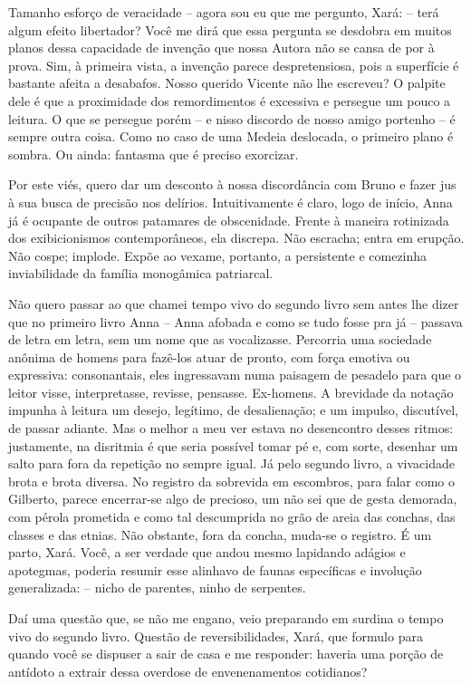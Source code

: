 Tamanho esforço de veracidade -- agora sou eu que me pergunto, Xará: --
terá algum efeito libertador? Você me dirá que essa pergunta se desdobra
em muitos planos dessa capacidade de invenção que nossa Autora não se
cansa de por à prova. Sim, à primeira vista, a invenção parece
despretensiosa, pois a superfície é bastante afeita a desabafos. Nosso
querido Vicente não lhe escreveu? O palpite dele é que a proximidade dos
remordimentos é excessiva e persegue um pouco a leitura. O que se
persegue porém -- e nisso discordo de nosso amigo portenho -- é sempre
outra coisa. Como no caso de uma Medeia deslocada, o primeiro plano é
sombra. Ou ainda: fantasma que é preciso exorcizar.

Por este viés, quero dar um desconto à nossa discordância com Bruno e
fazer jus à sua busca de precisão nos delírios. Intuitivamente é claro,
logo de início, Anna já é ocupante de outros patamares de obscenidade.
Frente à maneira rotinizada dos exibicionismos contemporâneos, ela
discrepa. Não escracha; entra em erupção. Não cospe; implode. Expõe ao
vexame, portanto, a persistente e comezinha inviabilidade da família
monogâmica patriarcal.

Não quero passar ao que chamei tempo vivo do segundo livro sem antes lhe
dizer que no primeiro livro Anna -- Anna afobada e como se tudo fosse
pra já -- passava de letra em letra, sem um nome que as vocalizasse.
Percorria uma sociedade anônima de homens para fazê-los atuar de pronto,
com força emotiva ou expressiva: consonantais, eles ingressavam numa
paisagem de pesadelo para que o leitor visse, interpretasse, revisse,
pensasse. Ex-homens. A brevidade da notação impunha à leitura um desejo,
legítimo, de desalienação; e um impulso, discutível, de passar adiante.
Mas o melhor a meu ver estava no desencontro desses ritmos: justamente,
na disritmia é que seria possível tomar pé e, com sorte, desenhar um
salto para fora da repetição no sempre igual. Já pelo segundo livro, a
vivacidade brota e brota diversa. No registro da sobrevida em escombros,
para falar como o Gilberto, parece encerrar-se algo de precioso, um não
sei que de gesta demorada, com pérola prometida e como tal descumprida
no grão de areia das conchas, das classes e das etnias. Não obstante,
fora da concha, muda-se o registro. É um parto, Xará. Você, a ser
verdade que andou mesmo lapidando adágios e apotegmas, poderia resumir
esse alinhavo de faunas específicas e involução generalizada: -- nicho
de parentes, ninho de serpentes.

Daí uma questão que, se não me engano, veio preparando em surdina o
tempo vivo do segundo livro. Questão de reversibilidades, Xará, que
formulo para quando você se dispuser a sair de casa e me responder:
haveria uma porção de antídoto a extrair dessa overdose de
envenenamentos cotidianos?

